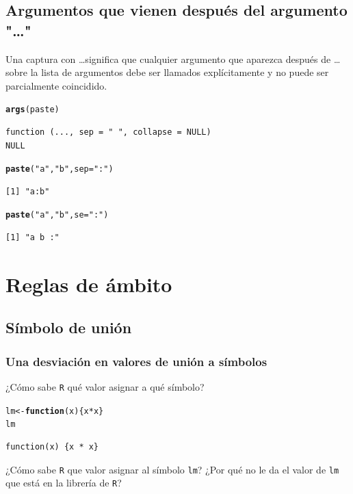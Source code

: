 \documentclass{article}\usepackage[]{graphicx}\usepackage[]{color}
\makeatletter
\newcommand{\hlstr}[1]{\textcolor[rgb]{0.192,0.494,0.8}{#1}}%
\newcommand{\hlopt}[1]{\textcolor[rgb]{0,0,0}{#1}}%
\newcommand{\hlstd}[1]{\textcolor[rgb]{0.345,0.345,0.345}{#1}}%
\newcommand{\hlkwa}[1]{\textcolor[rgb]{0.161,0.373,0.58}{\textbf{#1}}}%
\newcommand{\hlkwb}[1]{\textcolor[rgb]{0.69,0.353,0.396}{#1}}%
\newcommand{\hlkwc}[1]{\textcolor[rgb]{0.333,0.667,0.333}{#1}}%
\newcommand{\hlkwd}[1]{\textcolor[rgb]{0.737,0.353,0.396}{\textbf{#1}}}%
\newenvironment{kframe}{%
 \def\at@end@of@kframe{}%
 \ifinner\ifhmode%
  \def\at@end@of@kframe{\end{minipage}}%
  \begin{minipage}{\columnwidth}%
 \fi\fi%
 \def\FrameCommand##1{\hskip\@totalleftmargin \hskip-\fboxsep
 \colorbox{shadecolor}{##1}\hskip-\fboxsep
     \hskip-\linewidth \hskip-\@totalleftmargin \hskip\columnwidth}%
 \MakeFramed {\advance\hsize-\width
   \@totalleftmargin\z@ \linewidth\hsize
   \@setminipage}}%
 {\par\unskip\endMakeFramed%
 \at@end@of@kframe}
\newenvironment{knitrout}{}{} %
\makeatother
\begin{document}
  \subsection{Argumentos que vienen después del argumento "\dots"}
  Una captura con \dots significa que cualquier argumento que aparezca después de \dots sobre la lista de argumentos debe ser llamados explícitamente y no puede ser parcialmente coincidido.
\begin{knitrout}
\color{fgcolor}\begin{kframe}
\begin{alltt}
  \hlkwd{args}\hlstd{(paste)}
\end{alltt}
\begin{verbatim}
function (..., sep = " ", collapse = NULL) 
NULL
\end{verbatim}
\begin{alltt}
  \hlkwd{paste}\hlstd{(}\hlstr{"a"}\hlstd{,} \hlstr{"b"}\hlstd{,} \hlkwc{sep} \hlstd{=} \hlstr{":"}\hlstd{)}
\end{alltt}
\begin{verbatim}
[1] "a:b"
\end{verbatim}
\begin{alltt}
  \hlkwd{paste}\hlstd{(}\hlstr{"a"}\hlstd{,} \hlstr{"b"}\hlstd{,} \hlkwc{se} \hlstd{=} \hlstr{":"}\hlstd{)}
\end{alltt}
\begin{verbatim}
[1] "a b :"
\end{verbatim}
\end{kframe}
\end{knitrout}
  
\section{Reglas de ámbito}
  \subsection{Símbolo de unión}
    \subsubsection{Una desviación en valores de unión a símbolos}
    ¿Cómo sabe \texttt{R} qué valor asignar a qué símbolo?
\begin{knitrout}
\color{fgcolor}\begin{kframe}
\begin{alltt}
  \hlstd{lm} \hlkwb{<-} \hlkwa{function}\hlstd{(}\hlkwc{x}\hlstd{) \{x} \hlopt{*} \hlstd{x\}}
  \hlstd{lm}
\end{alltt}
\begin{verbatim}
function(x) {x * x}
\end{verbatim}
\end{kframe}
\end{knitrout}
    ¿Cómo sabe \texttt{R} que valor asignar al símbolo \texttt{lm}? ¿Por qué no le da el valor de \texttt{lm} que está en la librería de \texttt{R}?
\end{document}
